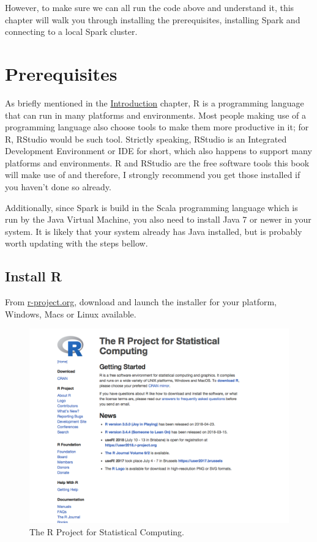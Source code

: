 \documentclass[]{book}
\theoremstyle{definition}
\theoremstyle{definition}
\theoremstyle{definition}
\theoremstyle{remark}
\begin{document}
However, to make sure we can all run the code above and understand it,
this chapter will walk you through installing the prerequisites,
installing Spark and connecting to a local Spark cluster.

\hypertarget{prerequisites}{%
\section{Prerequisites}\label{prerequisites}}

As briefly mentioned in the \protect\hyperlink{intro}{Introduction}
chapter, R is a programming language that can run in many platforms and
environments. Most people making use of a programming language also
choose tools to make them more productive in it; for R, RStudio would be
such tool. Strictly speaking, RStudio is an Integrated Development
Environment or IDE for short, which also happens to support many
platforms and environments. R and RStudio are the free software tools
this book will make use of and therefore, I strongly recommend you get
those installed if you haven't done so already.

Additionally, since Spark is build in the Scala programming language
which is run by the Java Virtual Machine, you also need to install Java
7 or newer in your system. It is likely that your system already has
Java installed, but is probably worth updating with the steps bellow.

\hypertarget{install-r}{%
\subsection{Install R}\label{install-r}}

From \href{https://r-project.org/}{r-project.org}, download and launch
the installer for your platform, Windows, Macs or Linux available.

\begin{figure}

{\centering \includegraphics[width=13.78in]{images/02-getting-started-download-r} 

}

\caption{The R Project for Statistical Computing.}\label{fig:r-download}
\end{figure}
\end{document}
